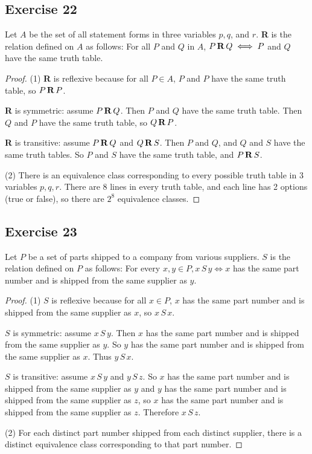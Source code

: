 \documentclass[14pt]{extarticle}
\begin{document}
\subsection{Exercise 22}
Let \(A\) be the set of all statement forms in three variables \(p, q\), and \(r\). {\bf R} is the relation 
defined on \(A\) as follows: For all \(P\) and \(Q\) in \(A\), \(P \,{\bf R}\, Q \iff P\) and \(Q\) have the same 
truth table.

\begin{proof}
(1) {\bf R} is reflexive because for all \(P \in A\), \(P\) and \(P\) have the same truth table, so \(P\,{\bf R}\, P\).

{\bf R} is symmetric: assume \(P \,{\bf R}\, Q\). Then \(P\) and \(Q\) have the same truth table. Then \(Q\) and
\(P\) have the same truth table, so \(Q \,{\bf R}\, P\).

{\bf R} is transitive: assume \(P \,{\bf R}\, Q\) and \(Q \,{\bf R}\, S\). Then \(P\) and \(Q\), and \(Q\) and \(S\)
have the same truth tables. So \(P\) and \(S\) have the same truth table, and \(P \,{\bf R}\, S\).

(2) There is an equivalence class corresponding to every possible truth table in 3 variables $p,q,r$. There are 8
lines in every truth table, and each line has 2 options (true or false), so there are \(2^8\) equivalence classes.
\end{proof}

\subsection{Exercise 23}
Let \(P\) be a set of parts shipped to a company from various suppliers. \(S\) is the relation defined on \(P\) 
as follows: For every \(x, y \in P, x \,S\, y \iff x\) has the same part number and is shipped from the same supplier 
as \(y\).

\begin{proof}
(1) \(S\) is reflexive because for all \(x \in P\), \(x\) has the same part number and is shipped from the same 
supplier as \(x\), so \(x \, S \, x\).

\(S\) is symmetric: assume \(x \,S\, y\). Then \(x\) has the same part number and is shipped from the same supplier 
as \(y\). So \(y\) has the same part number and is shipped from the same supplier as \(x\). Thus \(y \,S\, x\).

\(S\) is transitive: assume \(x \,S\, y\) and \(y \,S\, z\). So \(x\) has the same part number and is shipped from 
the same supplier as \(y\) and \(y\) has the same part number and is shipped from the same supplier as \(z\), so 
\(x\) has the same part number and is shipped from the same supplier as \(z\). Therefore \(x \,S\, z\).

(2) For each distinct part number shipped from each distinct supplier, there is a distinct equivalence class
corresponding to that part number.
\end{proof}
\end{document}

